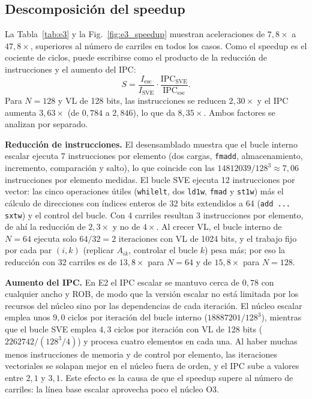 \documentclass[journal]{IEEEtran}
\begin{document}
\subsection{Descomposición del speedup}

La Tabla~\ref{tab:e3} y la Fig.~\ref{fig:e3_speedup} muestran
aceleraciones de $7{,}8\times$ a $47{,}8\times$, superiores al número
de carriles en todos los casos. Como el speedup es el cociente de
ciclos, puede escribirse como el producto de la reducción de
instrucciones y el aumento del IPC:
\begin{equation}
S = \frac{I_{\text{esc}}}{I_{\text{SVE}}}\cdot
    \frac{\text{IPC}_{\text{SVE}}}{\text{IPC}_{\text{esc}}} .
\end{equation}
Para $N=128$ y VL de 128 bits, las instrucciones se reducen
$2{,}30\times$ y el IPC aumenta $3{,}63\times$ (de $0{,}784$ a
$2{,}846$), lo que da $8{,}35\times$. Ambos factores se analizan por
separado.

\textbf{Reducción de instrucciones.} El desensamblado muestra que el
bucle interno escalar ejecuta 7 instrucciones por elemento (dos cargas,
\texttt{fmadd}, almacenamiento, incremento, comparación y salto), lo que
coincide con las $\num{14812039}/128^3 \approx 7{,}06$ instrucciones por
elemento medidas. El bucle SVE ejecuta 12 instrucciones por vector: las
cinco operaciones útiles (\texttt{whilelt}, dos \texttt{ld1w},
\texttt{fmad} y \texttt{st1w}) más el cálculo de direcciones con índices
enteros de 32 bits extendidos a 64 (\texttt{add ... sxtw}) y el control
del bucle. Con 4 carriles resultan 3 instrucciones por elemento, de ahí
la reducción de $2{,}3\times$ y no de $4\times$. Al crecer VL, el bucle
interno de $N=64$ ejecuta solo $64/32=2$ iteraciones con VL de 1024
bits, y el trabajo fijo por cada par $(i,k)$ (replicar $A_{ik}$,
controlar el bucle $k$) pesa más; por eso la reducción con 32 carriles
es de $13{,}8\times$ para $N=64$ y de $15{,}8\times$ para $N=128$.

\textbf{Aumento del IPC.} En E2 el IPC escalar se mantuvo cerca de
$0{,}78$ con cualquier ancho y ROB, de modo que la versión escalar no
está limitada por los recursos del núcleo sino por las dependencias de
cada iteración. El núcleo escalar emplea unos $9{,}0$ ciclos por
iteración del bucle interno ($\num{18887201}/128^3$), mientras que el
bucle SVE emplea $4{,}3$ ciclos por iteración con VL de 128 bits
($\num{2262742}/(128^3/4)$) y procesa cuatro elementos en cada una. Al
haber muchas menos instrucciones de memoria y de control por elemento,
las iteraciones vectoriales se solapan mejor en el núcleo fuera de
orden, y el IPC sube a valores entre $2{,}1$ y $3{,}1$. Este efecto es
la causa de que el speedup supere al número de carriles: la línea base
escalar aprovecha poco el núcleo O3.
\end{document}
